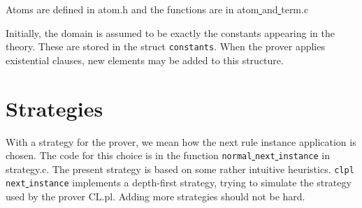 \documentclass[a4paper]{article}
\begin{document}
Atoms are defined in atom.h and the functions are in atom\underline{ }and\underline{ }term.c

Initially, the domain is assumed to be exactly the constants appearing in the theory. These are stored in the struct \verb|constants|. When the prover applies existential clauses, new elements may be added to this structure. 

\section{Strategies}
With a strategy for the prover, we mean how the next rule instance application is chosen. The code for this choice is in the function \verb|normal|\underline{ }\verb|next|\underline{ }\verb|instance| in strategy.c. The present strategy is based on some rather intuitive heuristics. \verb|clpl|\underline{ }\verb|next|\underline{ }\verb|instance| implements a depth-first strategy, trying to simulate the strategy used by the prover CL.pl. Adding more strategies should not be hard.
\end{document}
